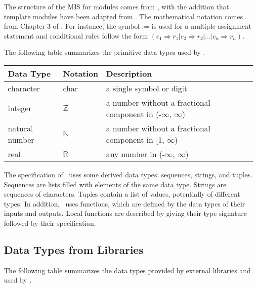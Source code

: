\documentclass[12pt, titlepage]{article}
\begin{document}

The structure of the MIS for modules comes from \citet{HoffmanAndStrooper1995},
with the addition that template modules have been adapted from
\cite{GhezziEtAl2003}.  The mathematical notation comes from Chapter 3 of
\citet{HoffmanAndStrooper1995}.  For instance, the symbol := is used for a
multiple assignment statement and conditional rules follow the form $(c_1
\Rightarrow r_1 | c_2 \Rightarrow r_2 | ... | c_n \Rightarrow r_n )$.

The following table summarizes the primitive data types used by \progname. 

\begin{center}
\renewcommand{\arraystretch}{1.2}
\noindent 
\begin{tabular}{l l p{7.5cm}} 
\toprule 
\textbf{Data Type} & \textbf{Notation} & \textbf{Description}\\ 
\midrule
character & char & a single symbol or digit\\
integer & $\mathbb{Z}$ & a number without a fractional component in (-$\infty$, $\infty$) \\
natural number & $\mathbb{N}$ & a number without a fractional component in [1, $\infty$) \\
real & $\mathbb{R}$ & any number in (-$\infty$, $\infty$)\\
\bottomrule
\end{tabular} 
\end{center}

\noindent
The specification of \progname \ uses some derived data types: sequences, strings, and
tuples. Sequences are lists filled with elements of the same data type. Strings
are sequences of characters. Tuples contain a list of values, potentially of
different types. In addition, \progname \ uses functions, which
are defined by the data types of their inputs and outputs. Local functions are
described by giving their type signature followed by their specification.

\subsection{Data Types from Libraries}

The following table summarizes the data types provided by external libraries and
used by \projname.
\end{document}
